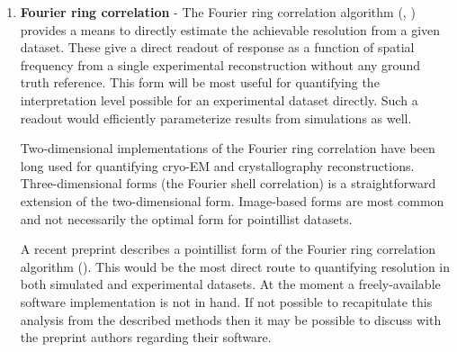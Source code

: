 \documentclass[10pt,a4paper]{article}
\begin{document}
\begin{enumerate}
	\item \textbf{Fourier ring correlation} - The Fourier ring correlation algorithm (\cite{nieuwenhuizen2013measuring}, \cite{salas2017angular}) provides a means to directly estimate the achievable resolution from a given dataset.  These give a direct readout of response as a function of spatial frequency from a single experimental reconstruction without any ground truth reference. This form will be most useful for quantifying the interpretation level possible for an experimental dataset directly.  Such a readout would efficiently parameterize results from simulations as well. 

	Two-dimensional implementations of the Fourier ring correlation have been long used for quantifying cryo-EM and crystallography reconstructions. Three-dimensional forms (the Fourier shell correlation) is a straightforward extension of the two-dimensional form.  Image-based forms are most common and not necessarily the optimal form for pointillist datasets.
	
	A recent preprint describes a pointillist form of the Fourier ring correlation algorithm (\cite{8759279}).  This would be the most direct route to quantifying resolution in both simulated and experimental datasets.  At the moment a freely-available software implementation is not in hand.  If not possible to recapitulate this analysis from the described methods then it may be possible to discuss with the preprint authors regarding their software.
	
\end{enumerate}


	
\end{document}
